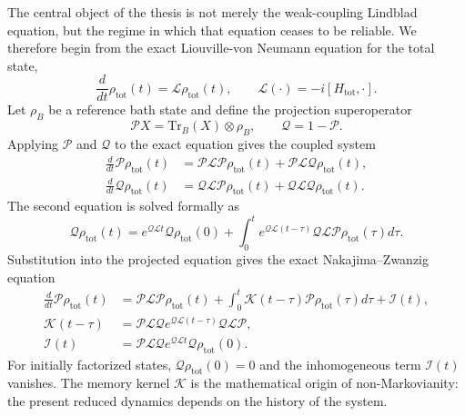 \documentclass[11pt]{article}
\begin{document}
The central object of the thesis is not merely the weak-coupling Lindblad equation, but the
regime in which that equation ceases to be reliable.  We therefore begin from the exact
Liouville-von Neumann equation for the total state,
\begin{equation}
    \frac{d}{dt}\rho_{\mathrm{tot}}(t)
    =
    \mathcal{L}\rho_{\mathrm{tot}}(t),
    \qquad
    \mathcal{L}(\cdot)=-i[H_{\mathrm{tot}},\cdot].
\end{equation}
Let $\rho_B$ be a reference bath state and define the projection superoperator
\begin{equation}
    \mathcal{P}X
    =
    \mathrm{Tr}_B(X)\otimes\rho_B,
    \qquad
    \mathcal{Q}=1-\mathcal{P}.
\end{equation}
Applying $\mathcal{P}$ and $\mathcal{Q}$ to the exact equation gives the coupled system
\begin{align}
    \frac{d}{dt}\mathcal{P}\rho_{\mathrm{tot}}(t)
    &=
    \mathcal{P}\mathcal{L}\mathcal{P}\rho_{\mathrm{tot}}(t)
    +
    \mathcal{P}\mathcal{L}\mathcal{Q}\rho_{\mathrm{tot}}(t),\\
    \frac{d}{dt}\mathcal{Q}\rho_{\mathrm{tot}}(t)
    &=
    \mathcal{Q}\mathcal{L}\mathcal{P}\rho_{\mathrm{tot}}(t)
    +
    \mathcal{Q}\mathcal{L}\mathcal{Q}\rho_{\mathrm{tot}}(t).
\end{align}
The second equation is solved formally as
\begin{equation}
    \mathcal{Q}\rho_{\mathrm{tot}}(t)
    =
    e^{\mathcal{Q}\mathcal{L}t}\mathcal{Q}\rho_{\mathrm{tot}}(0)
    +
    \int_0^t
    e^{\mathcal{Q}\mathcal{L}(t-\tau)}
    \mathcal{Q}\mathcal{L}\mathcal{P}\rho_{\mathrm{tot}}(\tau)
    d\tau .
\end{equation}
Substitution into the projected equation gives the exact Nakajima--Zwanzig equation
\begin{align}
    \frac{d}{dt}\mathcal{P}\rho_{\mathrm{tot}}(t)
    &=
    \mathcal{P}\mathcal{L}\mathcal{P}\rho_{\mathrm{tot}}(t)
    +
    \int_0^t
    \mathcal{K}(t-\tau)\mathcal{P}\rho_{\mathrm{tot}}(\tau)d\tau
    +
    \mathcal{I}(t),\\
    \mathcal{K}(t-\tau)
    &=
    \mathcal{P}\mathcal{L}\mathcal{Q}
    e^{\mathcal{Q}\mathcal{L}(t-\tau)}
    \mathcal{Q}\mathcal{L}\mathcal{P},\\
    \mathcal{I}(t)
    &=
    \mathcal{P}\mathcal{L}\mathcal{Q}
    e^{\mathcal{Q}\mathcal{L}t}
    \mathcal{Q}\rho_{\mathrm{tot}}(0).
\end{align}
For initially factorized states, $\mathcal{Q}\rho_{\mathrm{tot}}(0)=0$ and the inhomogeneous
term $\mathcal{I}(t)$ vanishes.  The memory kernel $\mathcal{K}$ is the mathematical origin
of non-Markovianity: the present reduced dynamics depends on the history of the system.
\end{document}
